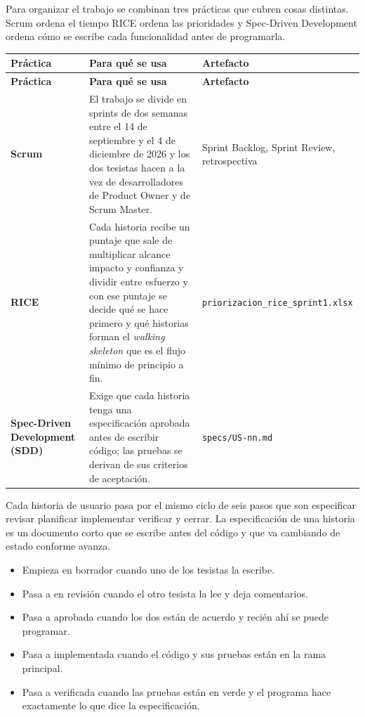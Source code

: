 Para organizar el trabajo se combinan tres prácticas que cubren cosas distintas. Scrum ordena el tiempo RICE ordena las prioridades y Spec-Driven Development ordena cómo se escribe cada funcionalidad antes de programarla.

\begin{longtable}{@{}>{\raggedright\arraybackslash}p{}>{\raggedright\arraybackslash}p{}>{\raggedright\arraybackslash}p{}@{}}
\toprule
\textbf{Práctica} & \textbf{Para qué se usa} & \textbf{Artefacto} \\
\midrule
\endfirsthead
\toprule
\textbf{Práctica} & \textbf{Para qué se usa} & \textbf{Artefacto} \\
\midrule
\endhead
\bottomrule
\endfoot
\endlastfoot
\textbf{Scrum} & El trabajo se divide en sprints de dos semanas entre el 14 de septiembre y el 4 de diciembre de 2026 y los dos tesistas hacen a la vez de desarrolladores de Product Owner y de Scrum Master. & Sprint Backlog, Sprint Review, retrospectiva \\
\textbf{RICE} & Cada historia recibe un puntaje que sale de multiplicar alcance impacto y confianza y dividir entre esfuerzo y con ese puntaje se decide qué se hace primero y qué historias forman el \emph{walking skeleton} que es el flujo mínimo de principio a fin. & \texttt{priorizacion\_\allowbreak{}rice\_\allowbreak{}sprint1.\allowbreak{}xlsx} \\
\textbf{Spec-Driven Development (SDD)} & Exige que cada historia tenga una especificación aprobada antes de escribir código; las pruebas se derivan de sus criterios de aceptación. & \texttt{specs/\allowbreak{}US-nn.\allowbreak{}md} \\
\end{longtable}

Cada historia de usuario pasa por el mismo ciclo de seis pasos que son especificar revisar planificar implementar verificar y cerrar. La especificación de una historia es un documento corto que se escribe antes del código y que va cambiando de estado conforme avanza.

\begin{itemize}
  \item Empieza en borrador cuando uno de los tesistas la escribe.
  \item Pasa a en revisión cuando el otro tesista la lee y deja comentarios.
  \item Pasa a aprobada cuando los dos están de acuerdo y recién ahí se puede programar.
  \item Pasa a implementada cuando el código y sus pruebas están en la rama principal.
  \item Pasa a verificada cuando las pruebas están en verde y el programa hace exactamente lo que dice la especificación.
\end{itemize}

